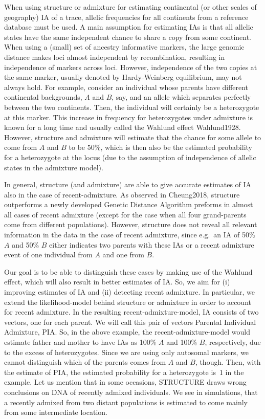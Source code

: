 \documentclass[12pt]{article}
\theoremstyle{definition}
\begin{document}
When using {\sc structure} or {\sc admixture} for estimating
continental (or other scales of geography) IA of a trace, allelic
frequencies for all continents from a reference database must be
used. A main assumption for estimating IAs is that all allelic states
have the same independent chance to share a copy from some continent.
When using a (small) set of ancestry informative markers, the large
genomic distance makes loci almost independent by recombination,
resulting in independence of markers across loci. However,
independence of the two copies at the same marker, usually denoted by
Hardy-Weinberg equilibrium, may not always hold. For example, consider
an individual whose parents have different continental backgrounds,
$A$ and $B$, say, and an allele which separates perfectly between the
two continents. Then, the individual will certainly be a heterozygote
at this marker. This increase in frequency for heterozygotes under
admixture is known for a long time and usually called the Wahlund
effect \cite{article}{Wahlund1928}.  However, {\sc structure} and {\sc
  admixture} will estimate that the chance for some allele to come
from $A$ and $B$ to be 50\%, which is then also be the estimated
probability for a heterozygote at the locus (due to the assumption of
independence of allelic states in the admixture model).

In general, {\sc structure} (and {\sc admixture}) are able to give
accurate estimates of IA also in the case of recent-admixture. As
observed in \cite{article}{Cheung2018}, {\sc structure} outperforms a
newly developed Genetic Distance Algorithm preforms in almost all
cases of recent admixture (except for the case when all four
grand-parents come from different populations). However, {\sc
  structure} does not reveal all relevant information in the data in
the case of recent admixture, since e.g.\ an IA of 50\% $A$ and 50\%
$B$ either indicates two parents with these IAs or a recent admixture
event of one individual from $A$ and one from $B$.

Our goal is to be able to distinguish these cases by making use of the
Wahlund effect, which will also result in better estimates of IA. So,
we aim for (i) improving estimates of IA and (ii) detecting recent
admixture. In particular, we extend the likelihood-model behind {\sc
  structure} or {\sc admixture} in order to account for recent
admixture. In the resulting recent-admixture-model, IA consists of two
vectors, one for each parent. We will call this pair of vectors
Parental Individual Admixture, PIA. So, in the above example, the
recent-admixture-model would estimate father and mother to have IAs as
100\% $A$ and 100\% $B$, respectively, due to the excess of
heterozygotes.  Since we are using only autosomal markers, we cannot
distinguish which of the parents comes from $A$ and $B$, though. Then,
with the estimate of PIA, the estimated probability for a heterozygote
is~1 in the example. Let us mention that in some occasions, {\sc
  STRUCTURE} draws wrong conclusions on DNA of recently admixed
individuals. We see in simulations, that a recently admixed from two
distant populations is estimated to come mainly from some intermediate
location.
\end{document}

